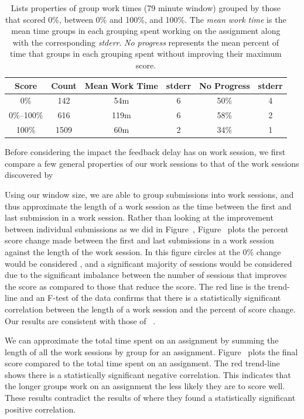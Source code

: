 \begin{table}
\centering
\begin{tabular}{|c||c|c|c|c|c|} \hline
Score & Count & Mean Work Time & stderr & No Progress & stderr \\ \hline \hline
0\% & 142 & 54m & 6 & 50\% & 4 \\ \hline
0\%--100\% & 616 & 119m & 6 & 58\% & 2 \\ \hline
100\% & 1509 & 60m & 2 & 34\% & 1 \\ \hline
\end{tabular}
\caption{Lists properties of group work times (79 minute window) grouped by
  those that scored 0\%, between 0\% and 100\%, and 100\%. The \emph{mean work
    time} is the mean time groups in each grouping spent working on the
  assignment along with the corresponding \emph{stderr}. \emph{No progress}
  represents the mean percent of time that groups in each grouping spent
  without improving their maximum score.}
\end{table}

Before considering the impact the feedback delay has on work session, we first
compare a few general properties of our work sessions to that of the work
sessions discovered by \spacco[.]{}

Using our window size, we are able to group submissions into work sessions, and
thus approximate the length of a work session as the time between the first and
last submission in a work session. Rather than looking at the improvement
between individual submissions as we did in
Figure~, Figure~
plots the percent score change made between the first and last submissions in a
work session against the length of the work session. In this figure circles at
the 0\% change would be considered \noi{}, and a significant majority of
sessions would be considered \imp{} due to the significant imbalance between
the number of sessions that improves the score as compared to those that reduce
the score. The red line is the trend-line and an F-test of the data confirms
that there is a statistically significant correlation between the length of a
work session and the percent of score change. Our results are consistent with
those of \spacco{}~\cite{Spacco:2013:TIP:2462476.2465594}.

We can approximate the total time spent on an assignment by summing the length
of all the work sessions by group for an
assignment. Figure~ plots the final score compared to
the total time spent on an assignment. The red trend-line shows there is a
statistically significant negative correlation. This indicates that the longer
groups work on an assignment the less likely they are to score well. These
results contradict the results of \spacco{} where they found a statistically
significant positive correlation.


